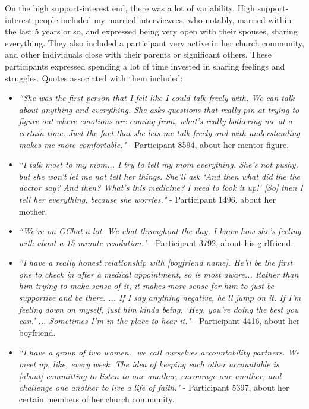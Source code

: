   On the high support-interest end, there was a lot of variability.
  High support-interest people included my married interviewees, who notably,
  married within the last 5 years or so,
  and expressed being very open with their spouses, sharing everything.
  They also included a participant very active in her church community,
  and other individuals close with their parents or significant others.
  These participants expressed spending a lot of time invested in
  sharing feelings and struggles.
  Quotes associated with them included:
  \begin{itemize}
  \item \textit{
  ``She was the first person that I felt like I could talk freely with.
  We can talk about anything and everything.
  She asks questions that really pin at trying to figure out
  where emotions are coming from, what's really bothering me at a certain time.
  Just the fact that she lets me talk freely and with understanding
  makes me more comfortable."
  }
  - Participant 8594, about her mentor figure.
  \item \textit{
  ``I talk most to my mom... I try to tell my mom everything.
  She's not pushy, but she won't let me not tell her things.
  She'll ask `And then what did the the doctor say? And then?
  What's this medicine? I need to look it up!'
  [So] then I tell her everything, because she worries."
  }
  - Participant 1496, about her mother.
  \item  \textit{
  ``We're on GChat a lot.
  We chat throughout the day.
  I know how she's feeling with about a 15 minute resolution."
  }
  - Participant 3792, about his girlfriend.
  \item \textit{
  ``I have a really honest relationship with [boyfriend name].
  He'll be the first one to check in after a medical appointment,
  so is most aware...
  Rather than him trying to make sense of it,
  it makes more sense for him to just be supportive and be there.
  ... If I say anything negative, he'll jump on it.
  If I'm feeling down on myself,
  just him kinda being, `Hey, you're doing the best you can.'
  ... Sometimes I'm in the place to hear it."
  }
  - Participant 4416, about her boyfriend.
  \item \textit{
  ``I have a group of two women.. we call ourselves accountability partners.
  We meet up, like, every week.
  The idea of keeping each other accountable is
  [about] committing to listen to one another, encourage one another,
  and challenge one another to live a life of faith."
  }
  - Participant 5397, about her certain members of her church community.
  \end{itemize}

